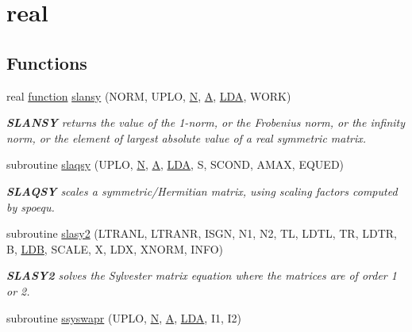 \hypertarget{group__realSYauxiliary}{}\section{real}
\label{group__realSYauxiliary}
\subsection*{Functions}
\begin{DoxyCompactItemize}
\item 
real \hyperlink{afunc_8m_a7b5e596df91eadea6c537c0825e894a7}{function} \hyperlink{group__realSYauxiliary_ga611e1beaaad792e0753a47723c8380ed}{slansy} (N\+O\+R\+M, U\+P\+L\+O, \hyperlink{polmisc_8c_a0240ac851181b84ac374872dc5434ee4}{N}, \hyperlink{classA}{A}, \hyperlink{example__user_8c_ae946da542ce0db94dced19b2ecefd1aa}{L\+D\+A}, W\+O\+R\+K)
\begin{DoxyCompactList}\small\item\em {\bfseries S\+L\+A\+N\+S\+Y} returns the value of the 1-\/norm, or the Frobenius norm, or the infinity norm, or the element of largest absolute value of a real symmetric matrix. \end{DoxyCompactList}\item 
subroutine \hyperlink{group__realSYauxiliary_gae8aee61b66e5c43af072432c98e8024a}{slaqsy} (U\+P\+L\+O, \hyperlink{polmisc_8c_a0240ac851181b84ac374872dc5434ee4}{N}, \hyperlink{classA}{A}, \hyperlink{example__user_8c_ae946da542ce0db94dced19b2ecefd1aa}{L\+D\+A}, S, S\+C\+O\+N\+D, A\+M\+A\+X, E\+Q\+U\+E\+D)
\begin{DoxyCompactList}\small\item\em {\bfseries S\+L\+A\+Q\+S\+Y} scales a symmetric/\+Hermitian matrix, using scaling factors computed by spoequ. \end{DoxyCompactList}\item 
subroutine \hyperlink{group__realSYauxiliary_ga768b34b0d6fc6604ccf54437d5e8e78c}{slasy2} (L\+T\+R\+A\+N\+L, L\+T\+R\+A\+N\+R, I\+S\+G\+N, N1, N2, T\+L, L\+D\+T\+L, T\+R, L\+D\+T\+R, B, \hyperlink{example__user_8c_a50e90a7104df172b5a89a06c47fcca04}{L\+D\+B}, S\+C\+A\+L\+E, X, L\+D\+X, X\+N\+O\+R\+M, I\+N\+F\+O)
\begin{DoxyCompactList}\small\item\em {\bfseries S\+L\+A\+S\+Y2} solves the Sylvester matrix equation where the matrices are of order 1 or 2. \end{DoxyCompactList}\item 
subroutine \hyperlink{group__realSYauxiliary_gad09b2a02a370c25292456c37fb1b8245}{ssyswapr} (U\+P\+L\+O, \hyperlink{polmisc_8c_a0240ac851181b84ac374872dc5434ee4}{N}, \hyperlink{classA}{A}, \hyperlink{example__user_8c_ae946da542ce0db94dced19b2ecefd1aa}{L\+D\+A}, I1, I2)

\end{DoxyCompactItemize}
